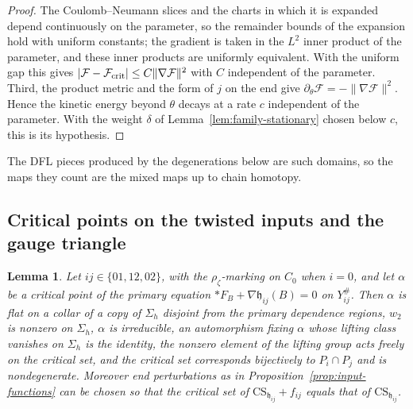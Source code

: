\documentclass[11pt]{amsart}
\newtheorem{lemma}[theorem]{Lemma}
\theoremstyle{definition}
\theoremstyle{remark}
\theoremstyle{plain}
\numberwithin{equation}{section}
\begin{document}
\begin{proof}
The Coulomb--Neumann slices and the charts in which it is expanded depend continuously on
the parameter, so the remainder bounds of the expansion hold with uniform constants; the
gradient is taken in the $L^2$ inner product of the parameter, and these inner products are
uniformly equivalent. With the uniform gap this gives
$|\mathcal F-\mathcal F_{\rm crit}|\le C\|\nabla\mathcal F\|^2$ with $C$ independent of the parameter. Third, the product metric and the form of $j$ on the
end give $\partial_\theta\mathcal F=-\|\nabla\mathcal F\|^2$. Hence the kinetic energy beyond
$\theta$ decays at a rate $c$ independent of the parameter. With the weight $\delta$ of
Lemma~\ref{lem:family-stationary} chosen below $c$, this is its hypothesis.
\end{proof}

The DFL pieces produced by the degenerations below are such domains, so the
maps they count are the mixed maps up to chain homotopy.

\subsection{Critical points on the twisted inputs and the gauge triangle}

\begin{lemma}\label{lem:twisted-critical}
Let $ij\in\{01,12,02\}$, with the $\rho_\zeta$-marking on $C_0$ when
$i=0$, and let $\alpha$ be a critical point of the primary equation
$*F_B+\nabla\mathfrak h_{ij}(B)=0$ on $Y_{ij}^\#$. Then $\alpha$ is flat on a collar of
a copy of $\Sigma_h$ disjoint from the primary dependence regions,
$w_2$ is nonzero on $\Sigma_h$, $\alpha$ is irreducible, an automorphism
fixing $\alpha$ whose lifting class vanishes on $\Sigma_h$ is the identity,
the nonzero element of the lifting group acts freely on the critical set, and the critical
set corresponds bijectively to $P_i\cap P_j$ and is nondegenerate.
Moreover end perturbations as in Proposition~\ref{prop:input-functions}
can be chosen so that the critical set of $\mathrm{CS}_{\mathfrak h_{ij}}+f_{ij}$ equals that
of $\mathrm{CS}_{\mathfrak h_{ij}}$.
\end{lemma}
\end{document}

